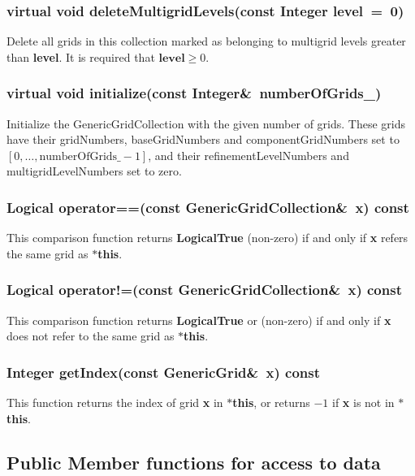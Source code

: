 \documentclass{article}
\begin{document}
  \subsubsection{virtual void deleteMultigridLevels(const Integer level~=~0)}
  \label{GenericGridCollection::deleteMultigridLevels(level)}
    Delete all grids in this collection marked as belonging to multigrid levels greater than \textbf{level}.
    It is required that $\textbf{level}\ge0$.

  \subsubsection{virtual void initialize(const Integer\&~numberOfGrids\_)}
  \label{GenericGridCollection::initialize(numberOfGrids_)}
    Initialize the GenericGridCollection with the given number of grids.
    These grids have their gridNumbers, baseGridNumbers and componentGridNumbers
    set to $[0,\dots,\mbox{numberOfGrids\_}-1]$, and their refinementLevelNumbers and
    multigridLevelNumbers set to zero.

  \subsubsection{Logical operator==(const GenericGridCollection\&~x) const}
  \label{GenericGridCollection::operator==(x) const}
    This comparison function returns \textbf{LogicalTrue} (non-zero) if and only if \textbf{x} refers the same grid as \textbf{$\ast$this}.

  \subsubsection{Logical operator!=(const GenericGridCollection\&~x) const}
  \label{GenericGridCollection::operator!=(x) const}
    This comparison function returns \textbf{LogicalTrue} or (non-zero) if and only if \textbf{x} does not refer to the same grid as \textbf{$\ast$this}.

  \subsubsection{Integer getIndex(const GenericGrid\&~x) const}
  \label{GenericGridCollection::getIndex(x) const}
    This function returns the index of grid \textbf{x} in \textbf{$\ast$this}, or returns $-1$ if \textbf{x} is not in \textbf{$\ast$this}.

\subsection{Public Member functions for access to data}
\label{GenericGridCollection::PublicAccessToData}
\end{document}

